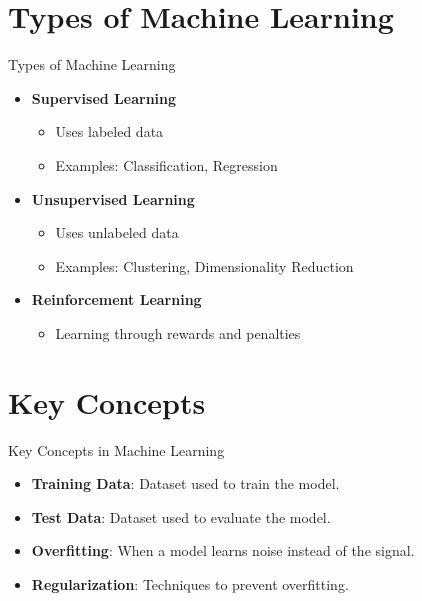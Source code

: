 \section{Types of Machine Learning}
\begin{frame}{Types of Machine Learning}
    \begin{itemize}
        \item \textbf{Supervised Learning}
        \begin{itemize}
            \item Uses labeled data
            \item Examples: Classification, Regression
        \end{itemize}
        \item \textbf{Unsupervised Learning}
        \begin{itemize}
            \item Uses unlabeled data
            \item Examples: Clustering, Dimensionality Reduction
        \end{itemize}
        \item \textbf{Reinforcement Learning}
        \begin{itemize}
            \item Learning through rewards and penalties
        \end{itemize}
    \end{itemize}
\end{frame}

\section{Key Concepts}
\begin{frame}{Key Concepts in Machine Learning}
    \begin{itemize}
        \item \textbf{Training Data}: Dataset used to train the model.
        \item \textbf{Test Data}: Dataset used to evaluate the model.
        \item \textbf{Overfitting}: When a model learns noise instead of the signal.
        \item \textbf{Regularization}: Techniques to prevent overfitting.
    \end{itemize}
\end{frame}

